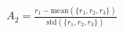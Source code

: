 \documentclass[preview]{standalone}
\begin{document}
\begin{align*}
A_2 = \frac{r_1 - \text{mean}\left(\{r_1, r_2, r_3\}\right)}{\text{std}\left(\{r_1, r_2, r_3\}\right)}
\end{align*}
\end{document}
